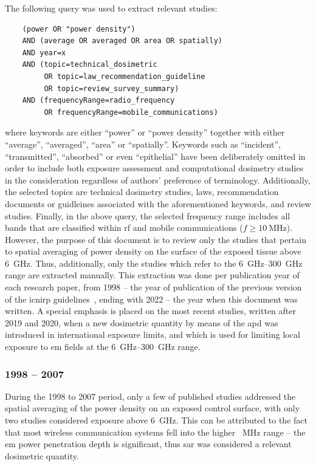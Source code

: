 The following query was used to extract relevant studies:
\begin{verbatim}
    (power OR "power density")
    AND (average OR averaged OR area OR spatially)
    AND year=x
    AND (topic=technical_dosimetric
         OR topic=law_recommendation_guideline
         OR topic=review_survey_summary)
    AND (frequencyRange=radio_frequency
         OR frequencyRange=mobile_communications)
\end{verbatim}
where keywords are either ``power'' or ``power density'' together with either ``average'', ``averaged'', ``area'' or ``spatially''.
Keywords such as ``incident'', ``transmitted'', ``absorbed'' or even ``epithelial'' have been deliberately omitted in order to include both exposure assessment and computational dosimetry studies in the consideration regardless of authors' preference of terminology.
Additionally, the selected topics are technical dosimetry studies, laws, recommendation documents or guidleines associated with the aforementioned keywords, and review studies.
Finally, in the above query, the selected frequency range includes all bands that are classified within \gls{rf} and mobile communications ($f \geq \SI{10}{\MHz}$).
However, the purpose of this document is to review only the studies that pertain to spatial averaging of power density on the surface of the exposed tissue above \SI{6}{\GHz}.
Thus, additionally, only the studies which refer to the \SIrange[range-units=single,range-phrase=--]{6}{300}{\GHz} range are extracted manually.
This extraction was done per publication year of each research paper, from 1998 -- the year of publication of the previous version of the \gls{icnirp} guidelines~\cite{ICNIRP2020Guidelines}, ending with 2022 -- the year when this document was written.
A special emphasis is placed on the most recent studies, written after 2019 and 2020, when a new dosimetric quantity by means of the \gls{apd} was introduced in international exposure limits, and which is used for limiting local exposure to \gls{em} fields at the \SIrange[range-units=single,range-phrase=--]{6}{300}{\GHz} range.

\subsubsection*{1998 -- 2007}
During the 1998 to 2007 period, only a few of published studies addressed the spatial averaging of the power density on an exposed control surface, with only two studies considered exposure above \SI{6}{\GHz}.
This can be attributed to the fact that most wireless communication systems fell into the higher \SI{}{\MHz} range --  the \gls{em} power penetration depth is significant, thus \gls{sar} was considered a relevant dosimetric quantity.

